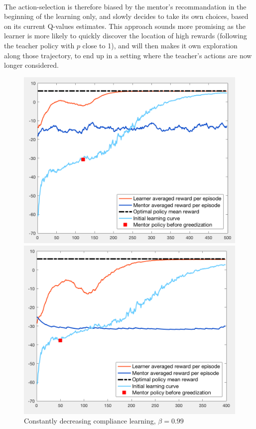 \documentclass[a4paper]{report}
\begin{document}
{{{{			\paragraph{} The action-selection is therefore biased by the mentor's recommandation in the beginning of the learning only, and slowly decides to take its own choices, based on its current Q-values estimates. This approach sounds more promising as the learner is more likely to quickly discover the location of high rewards (following the teacher policy with $p$ close to 1), and will then makes it own exploration along those trajectory, to end up in a setting where the teacher's actions are now longer considered. 
		
					\begin{figure}[h!]
				\begin{minipage}{0.5\linewidth}
					\begin{center}
						\includegraphics[width=0.95\linewidth]{comp_naive_compliance_120}
						\caption{Constantly decreasing compliance learning, $\beta = 0.99$}
						\label{fig::comp_naive_compliance_120}
					\end{center}
				\end{minipage}
				\begin{minipage}{0.5\linewidth}
					\begin{center}
						\includegraphics[width=0.95\linewidth]{comp_naive_compliance_50}

\end{center}
\end{minipage}
\end{figure}}}}}
\end{document}
